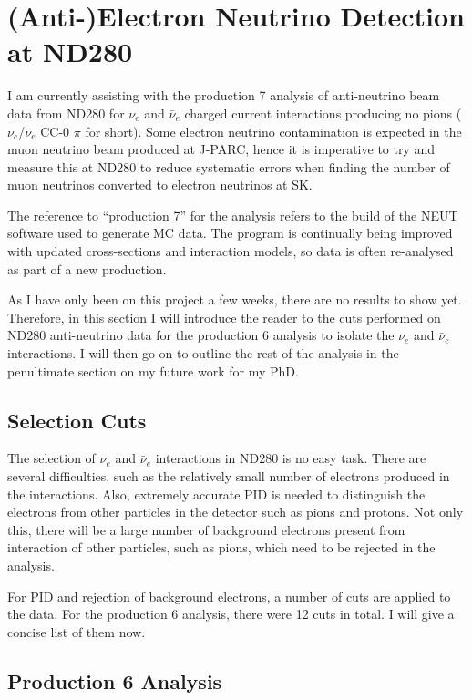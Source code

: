 \documentclass[aps,pra,12pt,notitlepage,tightenlines]{revtex4-1}
\newcommand{\nue}{$\nu_e$ }
\newcommand{\anue}{$\bar\nu_e$ }
\begin{document}
\section{\mbox{(Anti-)Electron} Neutrino Detection at ND280}
I am currently assisting with the production 7 analysis of anti-neutrino beam data from ND280 for \nue and \anue charged current interactions producing no pions ($\nu_e$/\anue CC-0 $\pi$ for short). Some electron neutrino contamination is expected in the muon neutrino beam produced at J-PARC, hence it is imperative to try and measure this at ND280 to reduce systematic errors when finding the number of muon neutrinos converted to electron neutrinos at SK.

The reference to ``production 7'' for the analysis refers to the build of the NEUT software used to generate MC data. The program is continually being improved with updated cross-sections and interaction models, so data is often re-analysed as part of a new production.

As I have only been on this project a few weeks, there are no results to show yet. Therefore, in this section I will introduce the reader to the cuts performed on ND280 anti-neutrino data for the production 6 analysis to isolate the \nue and \anue interactions. I will then go on to outline the rest of the analysis in the penultimate section on my future work for my PhD.

\subsection{Selection Cuts}
The selection of \nue and \anue interactions in ND280 is no easy task. There are several difficulties, such as the relatively small number of electrons produced in the interactions. Also, extremely accurate PID is needed to distinguish the electrons from other particles in the detector such as pions and protons. Not only this, there will be a large number of background electrons present from interaction of other particles, such as pions, which need to be rejected in the analysis. 

For PID and rejection of background electrons, a number of cuts are applied to the data. For the production 6 analysis, there were 12 cuts in total. I will give a concise list of them now.


\subsection{Production 6 Analysis}
\end{document}
